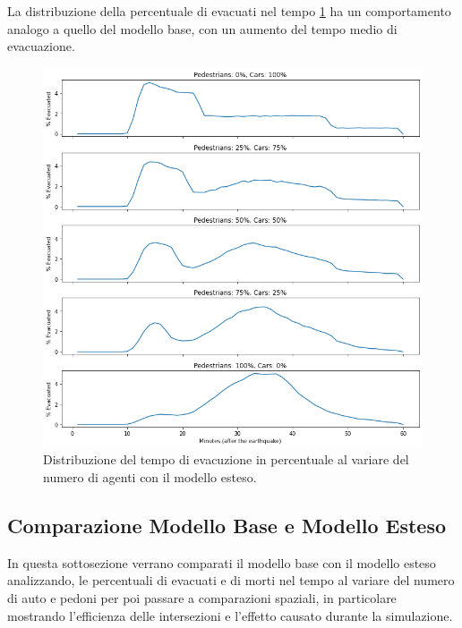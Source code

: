 \pagebreak

La distribuzione della percentuale di evacuati nel tempo \ref*{fig:analisi-new-evtimes} ha un comportamento analogo a quello del modello base, con un aumento del tempo medio di evacuazione.

\begin{figure}[ht]
    \centering
    \includegraphics[width=\textwidth]{images/analisi/new-evtimes.png}
    \caption{Distribuzione del tempo di evacuzione in percentuale al variare del numero di agenti con il modello esteso.}
    \label{fig:analisi-new-evtimes}
\end{figure}

\subsection{Comparazione Modello Base e Modello Esteso}
In questa sottosezione verrano comparati il modello base con il modello esteso analizzando,
le percentuali di evacuati e di morti nel tempo al variare del numero di auto e pedoni per poi passare a comparazioni spaziali,
in particolare mostrando l'efficienza delle intersezioni e l'effetto causato durante la simulazione.

\pagebreak

